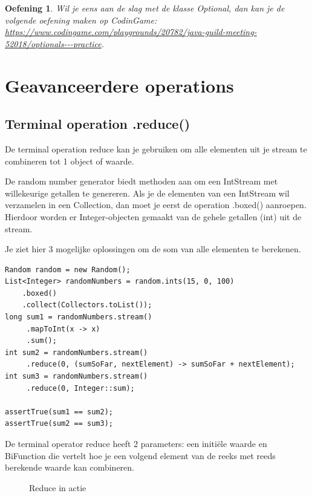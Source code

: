 \documentclass{tstextbook}
\newtheorem{envoefening}{Oefening}[chapter]
\newenvironment{oefening}
               {\begin{boxexercise}\begin{envoefening}}
               {\end{envoefening}\end{boxexercise}}
\begin{document}
\begin{oefening}
Wil je eens aan de slag met de klasse Optional, dan kan je de volgende oefening maken op CodinGame:\\
\url{https://www.codingame.com/playgrounds/20782/java-guild-meeting-52018/optionals---practice}.
\end{oefening}


\section{Geavanceerdere operations}

\subsection{Terminal operation .reduce()}

De terminal operation reduce kan je gebruiken om alle elementen uit je stream te combineren tot 1 object of waarde.

De random number generator biedt methoden aan om een IntStream met willekeurige getallen te genereren. Als je de elementen van een IntStream wil verzamelen in een Collection, dan moet je eerst de operation .boxed() aanroepen. Hierdoor worden er Integer-objecten gemaakt van de gehele getallen (int) uit de stream.

Je ziet hier 3 mogelijke oplossingen om de som van alle elementen te berekenen.
\begin{lstlisting}
Random random = new Random();
List<Integer> randomNumbers = random.ints(15, 0, 100)
    .boxed()
    .collect(Collectors.toList());
long sum1 = randomNumbers.stream()
     .mapToInt(x -> x)
     .sum();
int sum2 = randomNumbers.stream()
     .reduce(0, (sumSoFar, nextElement) -> sumSoFar + nextElement);
int sum3 = randomNumbers.stream()
     .reduce(0, Integer::sum);

assertTrue(sum1 == sum2);
assertTrue(sum2 == sum3);
\end{lstlisting}
		
De terminal operator reduce heeft 2 parameters: een initi\"ele waarde en BiFunction die vertelt hoe je een volgend element van de reeks met reeds berekende waarde kan combineren.

\begin{figure}[H]
\caption{Reduce in actie}
\label{fig:stream_reduce}
\end{figure}
\end{document}
